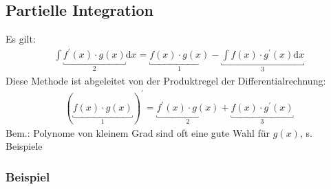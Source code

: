 \documentclass[12pt, titlepage]{article}
\renewcommand{\>}{\rightarrow}
\renewcommand{\*}{\cdot}
\begin{document}
	\subsection{Partielle Integration}
	Es gilt:
	\begin{align*}
		\int \underbracket{f^\prime(x)\*g(x)}_{2}\textrm{d}x=\underbracket{f(x)\*g(x)}_{1}-\underbracket{\int f(x)\*g^\prime(x)\textrm{d}x}_{3}
	\end{align*}
	Diese Methode ist abgeleitet von der Produktregel der Differentialrechnung:
	\begin{align*}
		(\underbracket{f(x)\*g(x)}_{1})^\prime=\underbracket{f^\prime(x)\*g(x)}_{2}+\underbracket{f(x)\*g^\prime(x)}_{3}
	\end{align*}
	Bem.: Polynome von kleinem Grad sind oft eine gute Wahl für $g(x)$, s. Beispiele
	\subsubsection*{Beispiel}
\end{document}
